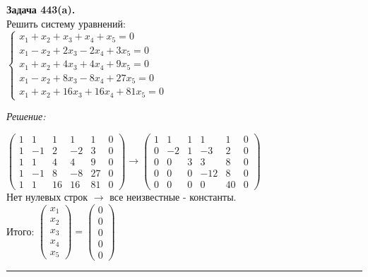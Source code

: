 \documentclass[a4paper, 12pt]{article}
\newenvironment{problem}[2][Задача]
    { \begin{mdframed}[backgroundcolor=gray!10] \textbf{#1 #2.} \\}
    {  \end{mdframed}}
\newenvironment{solution}
    {\textit{Решение: }}
    {\noindent\rule{7in}{1.5pt}}
\begin{document}
\begin{problem}{443(a)}
Решить систему уравнений:\\
$\left\{\begin{array}{l}
x_1+x_2+x_3+x_4+x_5=0\\
x_1-x_2+2x_3-2x_4+3x_5=0\\
x_1+x_2+4x_3+4x_4+9x_5=0\\
x_1-x_2+8x_3-8x_4+27x_5=0\\
x_1+x_2+16x_3+16x_4+81x_5=0
\end{array}\right.$

\end{problem}
\begin{solution}

$
\left(
\begin{array}{rrrrrrrr}
1 &  1 &  1 &  1 &  1 & 0 \\
1 & -1 &  2 & -2 &  3 & 0 \\
1 &  1 &  4 &  4 &  9 & 0 \\
1 & -1 &  8 & -8 & 27 & 0 \\
1 &  1 & 16 & 16 & 81 & 0
\end{array}
\right)
\rightarrow
\left(
\begin{array}{rrrrrrrr}
1 &  1 & 1 &   1 &  1 & 0 \\
0 & -2 & 1 &  -3 &  2 & 0 \\
0 &  0 & 3 &   3 &  8 & 0 \\
0 &  0 & 0 & -12 &  8 & 0 \\
0 &  0 & 0 &   0 & 40 & 0
\end{array}
\right)
$
\\
Нет нулевых строк $\rightarrow$ все неизвестные - константы. \\
Итого:
$
\left(
\begin{array}{r}
x_1 \\
x_2 \\
x_3 \\
x_4 \\
x_5
\end{array}
\right)
=
\left(
\begin{array}{r}
0 \\
0 \\
0 \\
0 \\
0
\end{array}
\right)
$

\end{solution}
\end{document}
